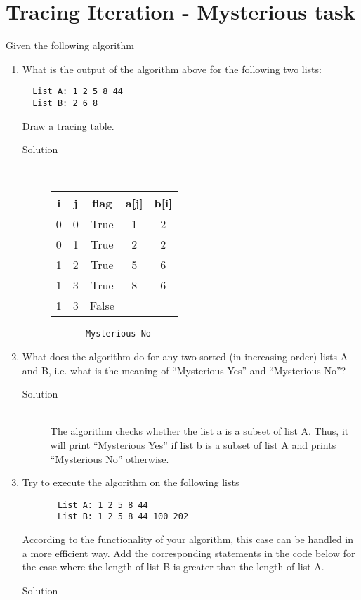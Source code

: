 \documentclass[11pt,a4paper]{article}
\begin{document}
\section{Tracing Iteration - Mysterious task}
Given the following algorithm

\begin{enumerate}[label=(\alph*)]
  \item What is the output of the algorithm above for the following two lists:
\begin{verbatim}
  List A: 1 2 5 8 44
  List B: 2 6 8
\end{verbatim}
\vfill
  Draw a tracing table.
  \begin{description}
    \item[Solution] \hfill \\
     \begin{tabular}{| c | c | c | c | c |}
     \hline
     i & j & flag & a[j] & b[i] \\ \hline
     0 & 0 & True & 1 & 2 \\
     0 & 1 & True & 2 & 2 \\
     1 & 2 & True & 5 &  6 \\
     1 & 3 & True & 8 & 6 \\
     1 & 3 & False  & & \\
     \hline
     \end{tabular}
     \begin{verbatim}
       Mysterious No
     \end{verbatim}
  \end{description}
  \item What does the algorithm do for any two sorted (in increasing order) lists A and B, i.e. what is the meaning
of  ``Mysterious Yes'' and ``Mysterious No''?
\begin{description}
  \item[Solution] \hfill \\
  The algorithm checks whether the list a is a subset of list A. Thus, it will print ``Mysterious Yes'' if list
b is a subset of list A and prints ``Mysterious No'' otherwise.
\end{description}
\item Try to execute the algorithm on the following lists
     \begin{verbatim}
       List A: 1 2 5 8 44
       List B: 1 2 5 8 44 100 202
     \end{verbatim}
According to the functionality of your algorithm, this case can be handled in a more efficient way. Add the
corresponding statements in the code below for the case where the length of list B is greater than the length
of list A.
\vfill

\begin{description}
  \item[Solution] \hfill \\
    
\end{description}
\vfill

\end{enumerate}
\end{document}
